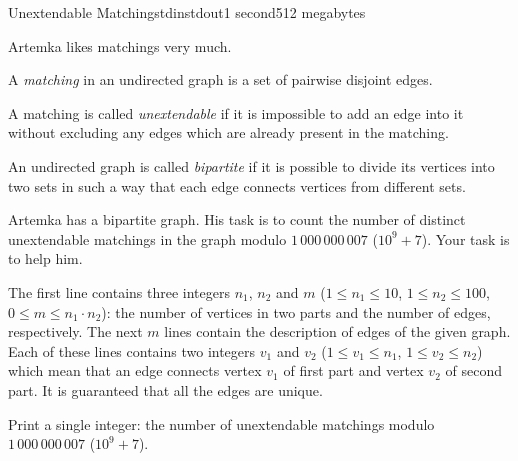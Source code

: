 \begin{problem}{Unextendable Matching}{stdin}{stdout}{1 second}{512 megabytes}

Artemka likes matchings very much.

A \textit{matching} in an undirected graph is a set of pairwise disjoint edges.

A matching is called \textit{unextendable} if it is impossible to add an edge into it without excluding any edges which are already present in the matching.

An undirected graph is called \textit{bipartite} if it is possible to divide its vertices into two sets in such a way that each edge connects vertices from different sets.

Artemka has a bipartite graph. His task is to count the number of distinct unextendable matchings in the graph modulo $1\,000\,000\,007$ ($10^9 + 7$). Your task is to help him.

\InputFile
The first line contains three integers $n_1$, $n_2$ and $m$ ($1 \le n_1 \le 10$, $1 \le n_2 \le 100$, $0 \le m \le n_1 \cdot n_2$): the number of vertices in two parts and the number of edges, respectively. The next $m$ lines contain the description of edges of the given graph. Each of these lines contains two integers $v_1$ and $v_2$ ($1 \le v_1 \le n_1$, $1 \le v_2 \le n_2$) which mean that an edge connects vertex $v_1$ of first part and vertex $v_2$ of second part. It is guaranteed that all the edges are unique.

\OutputFile
Print a single integer: the number of unextendable matchings modulo $1\,000\,000\,007$ ($10^9 + 7$).

\Examples

\begin{example}
%
%
\end{example}

\end{problem}
